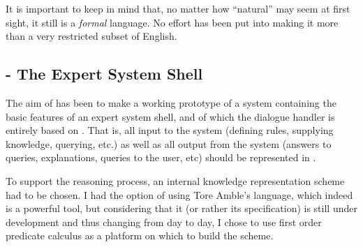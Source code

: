 It is important to keep in mind that, no matter how ``natural'' {\nal}
may seem at first sight, it still is a {\em formal\/} language. No
effort has been put into making it more than a very restricted subset
of English.

\subsection{{\nash} - The Expert System Shell}

The aim of {\nash} has been to make a working prototype of a system
containing the basic features of an expert system shell, and of which
the dialogue handler is entirely based on {\nal}. That is, all input
to the system (defining rules, supplying knowledge, querying, etc.) as
well as all output from the system (answers to queries, explanations,
queries to the user, etc) should be represented in {\nal}.

To support the reasoning process, an internal knowledge representation
scheme had to be chosen. I had the option of using Tore Amble's
{\solon} language, which indeed is a powerful tool, but considering
that it (or rather its specification) is still under development and
thus changing from day to day, I chose to use first order predicate
calculus as a platform on which to build the scheme.
